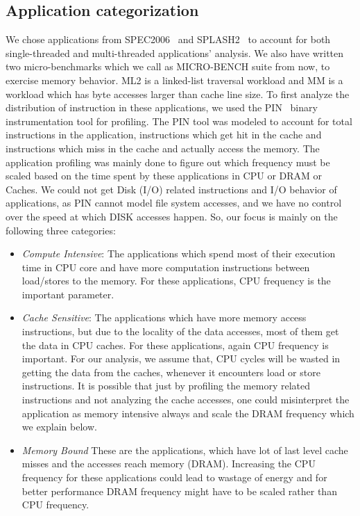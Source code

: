 \subsection{Application categorization}
We chose applications from  SPEC2006~\cite{spec2006} and SPLASH2~\cite{splash2} to account for both single-threaded and 
multi-threaded applications' analysis. 
We also have written two micro-benchmarks which we call as MICRO-BENCH
suite from now, to exercise 
memory behavior. ML2 is a linked-list traversal workload and 
MM is a workload which has byte accesses larger than
cache line size. 
To first analyze the distribution of instruction in these applications,
we used the PIN~\cite{pin} binary instrumentation tool for profiling.
The PIN tool was modeled to account for total instructions in the application, 
instructions which get hit in the cache and instructions which miss in the cache
and actually access the memory. 
The application profiling was mainly done to figure out
which frequency must be scaled  
based on the time spent by these applications
in CPU or DRAM or Caches.
We could not get Disk (I/O) related instructions and I/O behavior
of applications, as PIN cannot model file system accesses, and
we have no control over the speed at which DISK accesses happen. So, our focus is
mainly on the following three categories:

\begin{itemize} 
\item \textit{Compute Intensive}: The applications which spend most of their execution
time in CPU core and have more computation instructions
between load/stores to the memory. For these applications, CPU
frequency is the important parameter.
\item \textit{Cache Sensitive}: The applications which have more memory access instructions,
but due to the locality of the data accesses, most of them get the data in CPU caches.
For these applications, again CPU frequency is important. 
For our analysis, we assume that, 
CPU cycles will be wasted in getting the data from the caches, whenever
it encounters load or store instructions. 
It is possible that just
by profiling the memory related instructions and not analyzing the cache accesses,
one could misinterpret the application as memory intensive always
and scale the DRAM frequency which we explain below. 
\item \textit{Memory Bound} These are the applications, which have lot of last level cache misses
and the accesses reach memory (DRAM). Increasing the CPU frequency for these applications could 
lead to wastage of energy and for better performance DRAM frequency might have to
be scaled rather than CPU frequency. 
\end{itemize}

